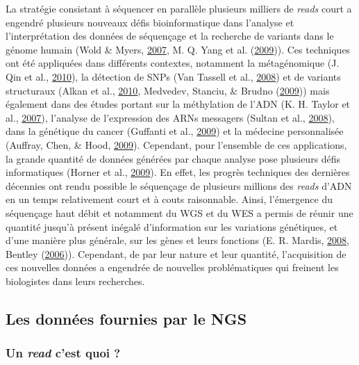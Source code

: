 \documentclass[12pt,twoside]{reedthesis}
\theoremstyle{definition}
\theoremstyle{definition}
\theoremstyle{remark}
\begin{document}
  La stratégie consistant à séquencer en parallèle plusieurs milliers de
  \emph{reads} court a engendré plusieurs nouveaux défis bioinformatique
  dans l'analyse et l'interprétation des données de séquençage et la
  recherche de variants dans le génome humain (Wold \& Myers,
  \protect\hyperlink{ref-Wold2007}{2007}, M. Q. Yang et al.
  (\protect\hyperlink{ref-Yang2009}{2009})). Ces techniques ont été
  appliquées dans différents contextes, notamment la métagénomique (J. Qin
  et al., \protect\hyperlink{ref-Qin2010}{2010}), la détection de SNPs
  (Van Tassell et al., \protect\hyperlink{ref-VanTassell2008}{2008}) et de
  variants structuraux (Alkan et al.,
  \protect\hyperlink{ref-Alkan2010}{2010}, Medvedev, Stanciu, \& Brudno
  (\protect\hyperlink{ref-Medvedev2009}{2009})) mais également dans des
  études portant sur la méthylation de l'ADN (K. H. Taylor et al.,
  \protect\hyperlink{ref-Taylor2007}{2007}), l'analyse de l'expression des
  ARNs messagers (Sultan et al.,
  \protect\hyperlink{ref-Sultan2008}{2008}), dans la génétique du cancer
  (Guffanti et al., \protect\hyperlink{ref-Guffanti2009}{2009}) et la
  médecine personnalisée (Auffray, Chen, \& Hood,
  \protect\hyperlink{ref-Auffray2009}{2009}). Cependant, pour l'ensemble
  de ces applications, la grande quantité de données générées par chaque
  analyse pose plusieurs défis informatiques (Horner et al.,
  \protect\hyperlink{ref-Horner2009}{2009}). En effet, les progrès
  techniques des dernières décennies ont rendu possible le séquençage de
  plusieurs millions des \emph{reads} d'ADN en un temps relativement court
  et à couts raisonnable. Ainsi, l'émergence du séquençage haut débit et
  notamment du WGS et du WES a permis de réunir une quantité jusqu'à
  présent inégalé d'information sur les variations génétiques, et d'une
  manière plus générale, sur les gènes et leurs fonctions (E. R. Mardis,
  \protect\hyperlink{ref-Mardis2008}{2008}, Bentley
  (\protect\hyperlink{ref-Bentley2006}{2006})). Cependant, de par leur
  nature et leur quantité, l'acquisition de ces nouvelles données a
  engendrée de nouvelles problématiques qui freinent les biologistes dans
  leurs recherches.
  
  \subsection{Les données fournies par le
  NGS}\label{les-donnees-fournies-par-le-ngs}
  
  \subsubsection{\texorpdfstring{Un \emph{read} c'est quoi
  ?}{Un read c'est quoi ?}}\label{un-read-cest-quoi}
  
\end{document}
